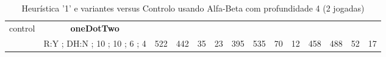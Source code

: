 \begin{table}[H]
{\begin{tabular}{|c|c|c|c|c|c|c|c|c|c|c|c|c|c|}
control & \cellcolor{blue!15}\textbf{oneDotTwo}& {\color[HTML]{00009B} } & {\color[HTML]{9A0000} } & {\color[HTML]{009901} } &  & {\color[HTML]{00009B} } & {\color[HTML]{9A0000} } & {\color[HTML]{009901} } &  & {\color[HTML]{00009B} } & {\color[HTML]{9A0000} } & {\color[HTML]{009901} } &  \\ 
 & \cellcolor{ blue!15}R:Y ; DH:N ; 10 ; 10 ; 6 ; 4 & \multirow{-2}{*}{{\color[HTML]{00009B} 522}} & \multirow{-2}{*}{{\color[HTML]{9A0000} 442}} & \multirow{-2}{*}{{\color[HTML]{009901} 35}} & \multirow{-2}{*}{23} & \multirow{-2}{*}{{\color[HTML]{00009B} 395}} & \multirow{-2}{*}{{\color[HTML]{9A0000} 535}} & \multirow{-2}{*}{{\color[HTML]{009901} 70}} & \multirow{-2}{*}{12} & \multirow{-2}{*}{{\color[HTML]{00009B} 458}} & \multirow{-2}{*}{{\color[HTML]{9A0000} 488}} & \multirow{-2}{*}{{\color[HTML]{009901} 52}} & \multirow{-2}{*}{17} \\ \hline
\end{tabular}} \caption{Heurística '1' e variantes versus Controlo usando Alfa-Beta com profundidade 4 (2 jogadas)} \label{onecontrol} \end{table}



